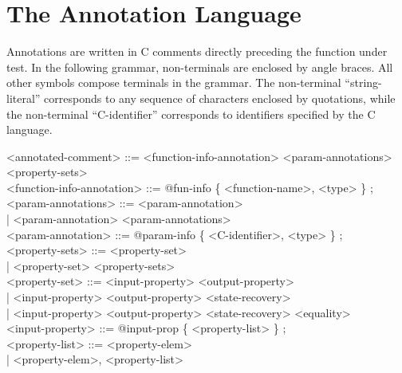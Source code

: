 \documentclass[notitlepage]{article}
\begin{document}
\section{The Annotation Language}

Annotations are written in C comments directly preceding the function under test. In the following grammar, non-terminals are enclosed by angle braces. All other symbols compose terminals in the grammar. The non-terminal ``string-literal'' corresponds to any sequence of characters enclosed by quotations, while the non-terminal ``C-identifier'' corresponds to identifiers specified by the C language.

\ttfamily

<annotated-comment> ::= <function-info-annotation> <param-annotations> <property-sets> \\

<function-info-annotation> ::= @fun-info \{ <function-name>, <type> \} ; \\

<param-annotations> ::= <param-annotation> \\
\phantom{1}\hspace{105pt}| <param-annotation> <param-annotations> \\

<param-annotation> ::= @param-info \{ <C-identifier>, <type> \} ; \\

<property-sets> ::= <property-set> \\
\phantom{1}\hspace{85pt}| <property-set> <property-sets> \\

<property-set> ::= <input-property> <output-property> \\
\phantom{1}\hspace{82pt}| <input-property> <output-property> <state-recovery> \\
\phantom{1}\hspace{82pt}| <input-property> <output-property> <state-recovery> <equality> \\

<input-property> ::= @input-prop \{ <property-list> \} ; \\

<property-list> ::= <property-elem> \\
\phantom{1}\hspace{85pt}| <property-elem>, <property-list> \\
\end{document}
